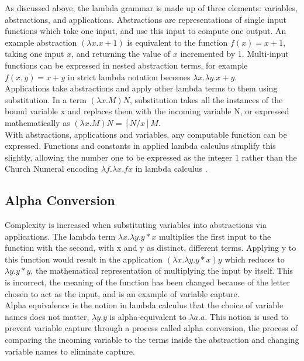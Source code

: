 \documentclass[a4paper,11pt]{report}
\begin{document}
As discussed above, the lambda grammar is made up of three elements: variables, abstractions, and applications. Abstractions are representations of single input functions which take one input, and use this input to compute one output. An example abstraction $(\lambda x.x+1)$ is equivalent to the function $f(x) = x+1$, taking one input $x$, and returning the value of $x$ incremented by 1. Multi-input functions can be expressed in nested abstraction terms, for example $f(x,y)=x+y$ in strict lambda notation becomes $\lambda x.\lambda y.x+y$.\\

Applications take abstractions and apply other lambda terms to them using substitution. In a term $(\lambda x.M)N$, substitution takes all the instances of the bound variable x and replaces them with the incoming variable N, or expressed mathematically as $(\lambda x.M)N=[N / x]M$.\\

With abstractions, applications and variables, any computable function can be expressed. Functions and constants in applied lambda calculus simplify this slightly, allowing the number one to be expressed as the integer 1 rather than the Church Numeral encoding $\lambda f.\lambda x.fx$ in lambda calculus \cite{Tarau2017}.

\subsection{Alpha Conversion}

Complexity is increased when substituting variables into abstractions via applications. The lambda term $\lambda x.\lambda y.y*x$ multiplies the first input to the function with the second, with x and y as distinct, different terms. Applying y to this function would result in the application $(\lambda x.\lambda y.y*x)y$ which reduces to $\lambda y.y*y$, the mathematical representation of multiplying the input by itself. This is incorrect, the meaning of the function has been changed because of the letter chosen to act as the input, and is an example of variable capture.\\

Alpha equivalence is the notion in lambda calculus that the choice of variable names does not matter, $\lambda y.y$ is alpha-equivalent to $\lambda a.a$. This notion is used to prevent variable capture through a process called alpha conversion, the process of comparing the incoming variable to the terms inside the abstraction and changing variable names to eliminate capture.\\
\end{document}
